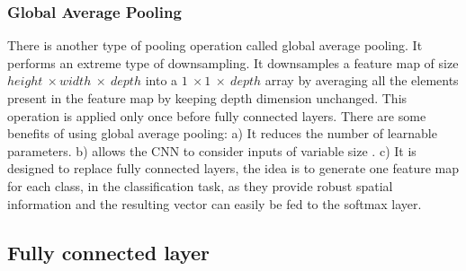 \subsubsection{Global Average Pooling}
There is another type of pooling operation called global average pooling. It performs an extreme type of downsampling. It downsamples a feature map of size $height\ \times width\ \times\ depth$ into a $1\ \times 1\ \times\ depth$ array by averaging all the elements present in the feature map by keeping depth dimension unchanged. This operation is applied only once before fully connected layers. There are some benefits of using global average pooling: a)  It reduces the number of learnable parameters. b) allows the \ac{CNN} to consider inputs of variable size \cite{articleCNNs} \cite{lin2014network}. c) It is designed to replace fully connected layers, the idea is to generate one feature map for each class, in the classification task, as they provide robust spatial information and the resulting vector can easily be fed to the softmax layer\footnotemark.






\subsection{Fully connected layer}


